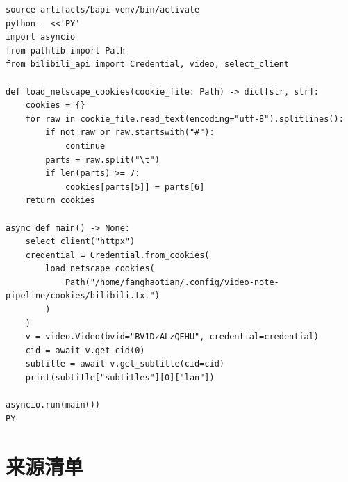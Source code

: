\documentclass[a4paper]{article}
\begin{document}
\begin{lstlisting}[caption={验证当前 cookie file 能否拿到目标视频字幕的参考命令}]
source artifacts/bapi-venv/bin/activate
python - <<'PY'
import asyncio
from pathlib import Path
from bilibili_api import Credential, video, select_client

def load_netscape_cookies(cookie_file: Path) -> dict[str, str]:
    cookies = {}
    for raw in cookie_file.read_text(encoding="utf-8").splitlines():
        if not raw or raw.startswith("#"):
            continue
        parts = raw.split("\t")
        if len(parts) >= 7:
            cookies[parts[5]] = parts[6]
    return cookies

async def main() -> None:
    select_client("httpx")
    credential = Credential.from_cookies(
        load_netscape_cookies(
            Path("/home/fanghaotian/.config/video-note-pipeline/cookies/bilibili.txt")
        )
    )
    v = video.Video(bvid="BV1DzALzQEHU", credential=credential)
    cid = await v.get_cid(0)
    subtitle = await v.get_subtitle(cid=cid)
    print(subtitle["subtitles"][0]["lan"])

asyncio.run(main())
PY
\end{lstlisting}

\section{来源清单}
\end{document}
